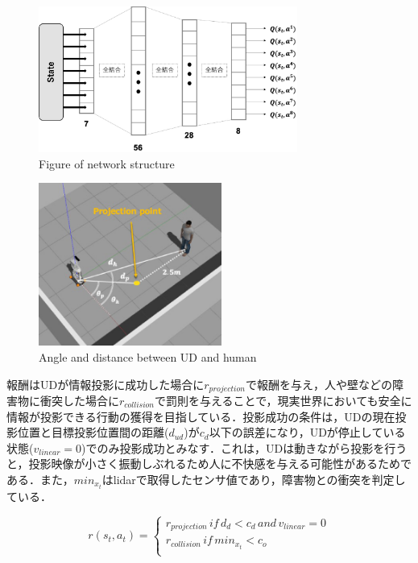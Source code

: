 \documentclass[12pt]{sonota/aislab}
\begin{document}
\begin{figure}[t]
\begin{center}
\includegraphics[clip, width=8.5cm]{figs/network_structure.eps}
\caption{Figure of network structure}
\label{structure}
\end{center}
\end{figure}

\begin{figure}[t]
\begin{center}
\includegraphics[clip, width=6cm]{figs/input_term.eps}
\caption{Angle and distance between UD and human}
\label{input_term}
\end{center}
\end{figure}

報酬はUDが情報投影に成功した場合に$r_{projection}$で報酬を与え，人や壁などの障害物に衝突した場合に$r_{collision}$で罰則を与えることで，現実世界においても安全に情報が投影できる行動の獲得を目指している．投影成功の条件は，UDの現在投影位置と目標投影位置間の距離($d_{ud}$)が$c_{d}$以下の誤差になり，UDが停止している状態($v_{linear}=0$)でのみ投影成功とみなす．これは，UDは動きながら投影を行うと，投影映像が小さく振動しぶれるため人に不快感を与える可能性があるためである．また，$min_{x_t}$はlidarで取得したセンサ値であり，障害物との衝突を判定している．

\begin{equation}
r(s_{t},a_{t})= \left \{
\begin{array}{l}
r_{projection}\,if\,d_{d}<c_{d}\,and\,v_{linear}=0 \\
r_{collision}\,if\,min_{x_{t}} < c_{o} \\
\end{array}
\right.
\end{equation}
\end{document}
